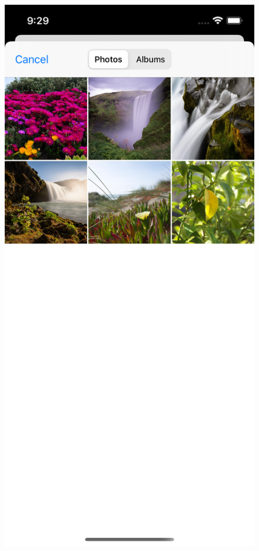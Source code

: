 \documentclass[a4paper,11pt]{article}
\begin{document}
\begin{figure}[H]
    \includegraphics[width={0.3\linewidth}]{img/ios_test_app/testapp_library.png}

\end{figure}
\end{document}
